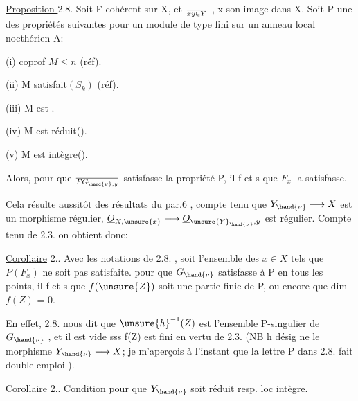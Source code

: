 
\uline{Proposition }2.8.  Soit F cohérent sur X, et  $\over{x}{y}\in Y$ , x son image
dans X.   Soit P une des propriétés suivantes pour
un module de type fini sur un anneau local noethérien A:

(i)   coprof $M\leqslant n$   (réf).

(ii)  M satisfait$(S_k)$  (réf).

(iii)  M est .

(iv)  M est réduit().

(v)   M est intègre().

Alors, pour que $\over{F}{G}_{\hand{\nu},y}$ satisfasse la propriété P, il f et s que $F_x$ la
satisfasse.

Cela résulte aussitôt des résultats du par.6 , compte tenu que
 $Y_{\hand{\nu}}\longrightarrow X$  est un morphisme régulier,   $\underline{O}_{X,\unsure{x}}\longrightarrow \underline{O}_{\unsure{Y}_{\hand{\nu}},y}$ est
régulier.  Compte tenu de 2.3. on obtient donc:

\uline{Corollaire} 2..  Avec les notations de 2.8. , soit  l'ensemble
des $x\in X$ tels que $P(F_x)$ ne soit pas satisfaite.  pour que
$G_{\hand{\nu}}$ satisfasse à P en tous les points, il f et s que $f(\unsure{Z})$ soit une
partie finie de P, ou encore que  dim $\overline{f(Z)}$ = 0.

En effet, 2.8. nous dit que $\unsure{h}^{-1}(Z)$ est l'ensemble P-singulier
de $G_{\hand{\nu}}$ , et il est vide sss f(Z) est fini en vertu de 2.3. (NB h désig
\margin{|} ne le morphisme $Y_{\hand{\nu}}\longrightarrow X$; je m'aperçois à l'instant que la lettre P
\margin{|} dans 2.8. fait double emploi ).

\margin{|} \uline{Corollaire} 2..  Condition pour que $Y_{\hand{\nu}}$ soit réduit resp. loc intègre.


